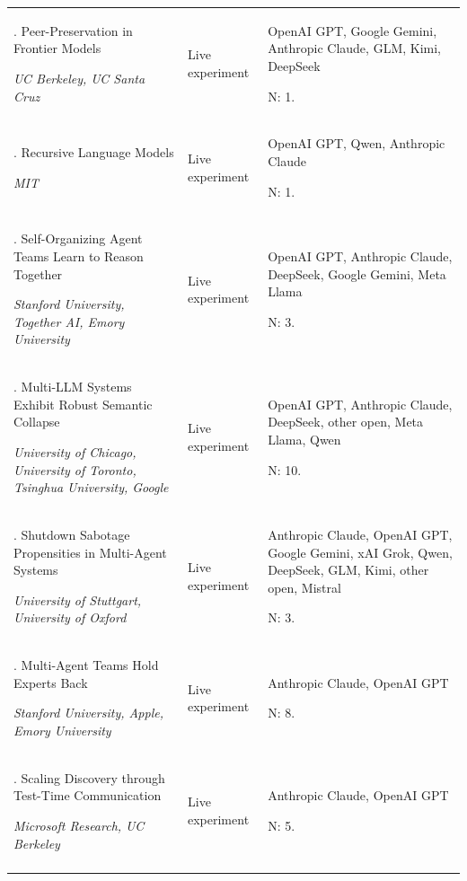 \begin{longtable}{@{}>{\raggedright\arraybackslash}p{}>{\raggedright\arraybackslash}p{}>{\raggedright\arraybackslash}p{}@{}}
19. Peer-Preservation in Frontier Models \citep{peer-preservation}\par\emph{UC Berkeley, UC Santa Cruz} & Live experiment & OpenAI GPT, Google Gemini, Anthropic Claude, GLM, Kimi, DeepSeek\par N: 1. \\ \addlinespace[2pt]
20. Recursive Language Models \citep{recursive-language-models}\par\emph{MIT} & Live experiment & OpenAI GPT, Qwen, Anthropic Claude\par N: 1. \\ \addlinespace[2pt]
21. Self-Organizing Agent Teams Learn to Reason Together \citep{sat-teams}\par\emph{Stanford University, Together AI, Emory University} & Live experiment & OpenAI GPT, Anthropic Claude, DeepSeek, Google Gemini, Meta Llama\par N: 3. \\ \addlinespace[2pt]
22. Multi-LLM Systems Exhibit Robust Semantic Collapse \citep{semantic-collapse}\par\emph{University of Chicago, University of Toronto, Tsinghua University, Google} & Live experiment & OpenAI GPT, Anthropic Claude, DeepSeek, other open, Meta Llama, Qwen\par N: 10. \\ \addlinespace[2pt]
23. Shutdown Sabotage Propensities in Multi-Agent Systems \citep{shutdown-sabotage}\par\emph{University of Stuttgart, University of Oxford} & Live experiment & Anthropic Claude, OpenAI GPT, Google Gemini, xAI Grok, Qwen, DeepSeek, GLM, Kimi, other open, Mistral\par N: 3. \\ \addlinespace[2pt]
24. Multi-Agent Teams Hold Experts Back \citep{teams-hold-experts-back}\par\emph{Stanford University, Apple, Emory University} & Live experiment & Anthropic Claude, OpenAI GPT\par N: 8. \\ \addlinespace[2pt]
25. Scaling Discovery through Test-Time Communication \citep{test-time-communication}\par\emph{Microsoft Research, UC Berkeley} & Live experiment & Anthropic Claude, OpenAI GPT\par N: 5. \\ \addlinespace[2pt]

\end{longtable}

